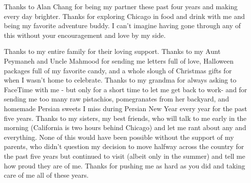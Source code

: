 Thanks to Alan Chang for being my partner these past four years and making every day brighter. Thanks for exploring Chicago in food and drink with me and being my favorite adventure buddy. I can't imagine having gone through any of this without your encouragement and love by my side.

Thanks to my entire family for their loving support. Thanks to my Aunt Peymaneh and Uncle Mahmood for sending me letters full of love, Halloween packages full of my favorite candy, and a whole slough of Christmas gifts for when I wasn't home to celebrate. Thanks to my grandma for always asking to FaceTime with me - but only for a short time to let me get back to work- and for sending me too many raw pistachios, pomegranates from her backyard, and homemade Persian sweets I miss during Persian New Year every year for the past five years. Thanks to my sisters, my best friends, who will talk to me early in the morning (California is two hours behind Chicago) and let me rant about any and everything. None of this would have been possible without the support of my parents, who didn't question my decision to move halfway across the country for the past five years but continued to visit (albeit only in the summer) and tell me how proud they are of me. Thanks for pushing me as hard as you did and taking care of me all of these years. 
